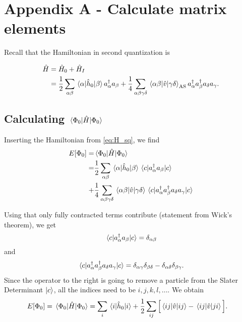 \section{Appendix A - Calculate matrix elements} \label{sec:appendixa}
Recall that the Hamiltonian in second quantization is 

\begin{align}
\hat{H}&=\hat{H}_0 + \hat{H}_I\notag\\
&=\frac{1}{2}\sum_{\alpha\beta}\mel{\alpha}{\hat{h}_0}{\beta}a_{\alpha}^{\dagger}a_{\beta}
+\frac{1}{4}\sum_{\alpha\beta\gamma\delta}\mel{\alpha\beta}{\hat{v}}{\gamma\delta}_{\text{AS}}a_{\alpha}^{\dagger}a_{\beta}^{\dagger}a_{\delta}a_{\gamma}.
\label{eq:H_sq}
\end{align}

\subsection{Calculating $\mel{\Phi_0}{\hat{H}}{\Phi_0}$}
Inserting the Hamiltonian from \eqref{eq:H_sq}, we find
\begin{align}
E[\Phi_0]=&\mel{\Phi_0}{\hat{H}}{\Phi_0}\notag\\
=&\frac{1}{2}\sum_{\alpha\beta}\mel{\alpha}{\hat{h}_0}{\beta}\mel{c}{a_{\alpha}^{\dagger}a_{\beta}}{c}\\
+&\frac{1}{4}\sum_{\alpha\beta\gamma\delta}\mel{\alpha\beta}{\hat{v}}{\gamma\delta}\mel{c}{a_{\alpha}^{\dagger}a_{\beta}^{\dagger}a_{\delta}a_{\gamma}}{c}\notag
\end{align}

Using that only fully contracted terms contribute (statement from Wick's theorem), we get
\begin{equation}
\mel{c}{a_{\alpha}^{\dagger}a_{\beta}}{c}=\delta_{\alpha\beta}
\end{equation}
and
\begin{equation}
\mel{c}{a_{\alpha}^{\dagger}a_{\beta}^{\dagger}a_{\delta}a_{\gamma}}{c}=\delta_{\alpha\gamma}\delta_{\beta\delta}-\delta_{\alpha\delta}\delta_{\beta\gamma}.
\end{equation}
Since the operator to the right is going to remove a particle from the Slater Determinant $\ket{c}$, all the indices need to be $i,j,k,l,\hdots$. We obtain
\begin{align}
E[\Phi_0]=\mel{\Phi_0}{\hat{H}}{\Phi_0}&=\sum_i\mel{i}{\hat{h}_0}{i}+\frac{1}{2}\sum_{ij}\Big[\mel{ij}{\hat{v}}{ij}-\mel{ij}{\hat{v}}{ji}\Big].
\end{align}

